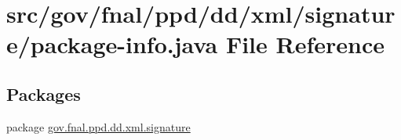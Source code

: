 \hypertarget{gov_2fnal_2ppd_2dd_2xml_2signature_2package-info_8java}{\section{src/gov/fnal/ppd/dd/xml/signature/package-\/info.java File Reference}
\label{gov_2fnal_2ppd_2dd_2xml_2signature_2package-info_8java}
}
\subsection*{Packages}
\begin{DoxyCompactItemize}
\item 
package \hyperlink{namespacegov_1_1fnal_1_1ppd_1_1dd_1_1xml_1_1signature}{gov.\-fnal.\-ppd.\-dd.\-xml.\-signature}
\end{DoxyCompactItemize}
